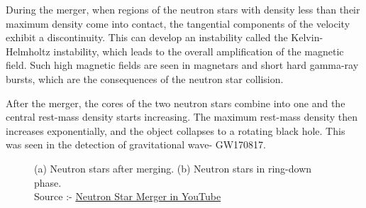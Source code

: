 \noindent
During the merger, when regions of the neutron stars with density less than their maximum density come into contact, the tangential components of the velocity exhibit a discontinuity. This can develop an instability called the Kelvin-Helmholtz instability, which leads to the overall amplification of the magnetic field. Such high magnetic fields are seen in magnetars and short hard gamma-ray bursts, which are the consequences of the neutron star collision.

After the merger, the cores of the two neutron stars combine into one and the central rest-mass density starts increasing. The maximum rest-mass density then increases exponentially, and the object collapses to a rotating black hole. This was seen in the detection of gravitational wave- GW170817.

\begin{figure}[h]
    \centering
    \qquad
    \caption{(a) Neutron stars after merging. (b) Neutron stars in ring-down phase. \\ Source :- \href{https://youtu.be/y8VDwGi0r0E}{Neutron Star Merger in YouTube}} 
\end{figure}

